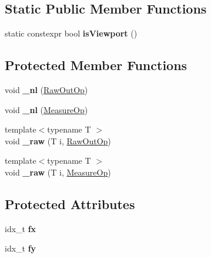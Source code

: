 \subsection*{Static Public Member Functions}
\begin{DoxyCompactItemize}
\item 
\mbox{\label{classViewport_aa64aab939c53ecde5d08d677ba67a02e}} 
static constexpr bool {\bfseries is\+Viewport} ()
\end{DoxyCompactItemize}
\subsection*{Protected Member Functions}
\begin{DoxyCompactItemize}
\item 
\mbox{\label{classViewport_a7f6a61e55271d1f567644e3cc39d3474}} 
void {\bfseries \+\_\+nl} (\hyperlink{structOutOp}{Raw\+Out\+Op})
\item 
\mbox{\label{classViewport_a7a93a77217f9452f05164116b0a64d65}} 
void {\bfseries \+\_\+nl} (\hyperlink{structOutOp}{Measure\+Op})
\item 
\mbox{\label{classViewport_a2a88057ad99cbaf5869ddbef39f70545}} 
{\footnotesize template$<$typename T $>$ }\\void {\bfseries \+\_\+raw} (T i, \hyperlink{structOutOp}{Raw\+Out\+Op})
\item 
\mbox{\label{classViewport_af7abaca109e8abbb3791e29b38c52318}} 
{\footnotesize template$<$typename T $>$ }\\void {\bfseries \+\_\+raw} (T i, \hyperlink{structOutOp}{Measure\+Op})
\end{DoxyCompactItemize}
\subsection*{Protected Attributes}
\begin{DoxyCompactItemize}
\item 
\mbox{\label{classViewport_aeba4a7858ba0e1e3d35367ca850ca1cc}} 
idx\+\_\+t {\bfseries fx}
\item 
\mbox{\label{classViewport_ace9587cdf387c13eb92881e7940940a8}} 
idx\+\_\+t {\bfseries fy}
\end{DoxyCompactItemize}


